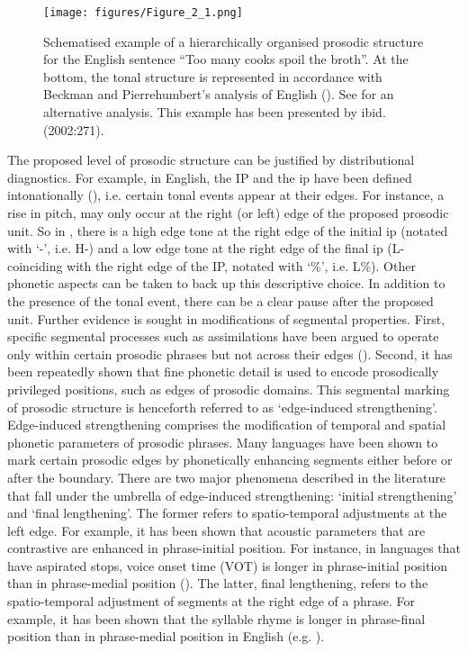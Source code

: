 \begin{figure}
  \centering 
   \texttt{[image: figures/Figure\_2\_1.png]}
  \caption{Schematised example of a hierarchically organised prosodic structure for the English sentence “Too many cooks spoil the broth”. At the bottom, the tonal structure is represented in accordance with Beckman and Pierrehumbert’s analysis of English (\citeyear{BeckmanPierr1986}). See \citet{Gussenhoven2002} for an alternative analysis. This example has been presented by ibid. (2002:271).}
   \label{fig:2.1}
   \end{figure}

The proposed level of prosodic structure can be justified by distributional diagnostics. For example, in English, the IP and the ip have been defined intonationally (\citealt{BeckmanPierr1986}), i.e. certain tonal events appear at their edges. For instance, a rise in pitch, may only occur at the right (or left) edge of the proposed prosodic unit. So in , there is a high edge tone at the right edge of the initial ip (notated with ‘-’, i.e. H-) and a low edge tone at the right edge of the final ip (L- coinciding with the right edge of the IP, notated with ‘\%’, i.e. L\%). Other phonetic aspects can be taken to back up this descriptive choice. In addition to the presence of the tonal event, there can be a clear pause after the proposed unit. Further evidence is sought in modifications of segmental properties. First, specific segmental processes such as assimilations have been argued to operate only within certain prosodic phrases but not across their edges (\citealt{NesporVogel1986}). Second, it has been repeatedly shown that fine phonetic detail is used to encode prosodically privileged positions, such as edges of prosodic domains. This segmental marking of prosodic structure is henceforth referred to as ‘edge-induced strengthening’. Edge-induced strengthening comprises the modification of temporal and spatial phonetic parameters of prosodic phrases. Many languages have been shown to mark certain prosodic edges by phonetically enhancing segments either before or after the boundary. There are two major phenomena described in the literature that fall under the umbrella of edge-induced strengthening: ‘initial strengthening’ and ‘final lengthening’. The former refers to spatio-temporal adjustments at the left edge. For example, it has been shown that acoustic parameters that are contrastive are enhanced in phrase-initial position. For instance, in languages that have aspirated stops, voice onset time (VOT) is longer in phrase-initial position than in phrase-medial position (\citealt{Cooper1991,PierrTalkin1992,Jun1993,ChoSun2000,Choi2003,Cole.etal2003}). The latter, final lengthening, refers to the spatio-temporal adjustment of segments at the right edge of a phrase. For example, it has been shown that the syllable rhyme is longer in phrase-final position than in phrase-medial position in English  (e.g. 
\citealt{TurkShattuck2007}). 

